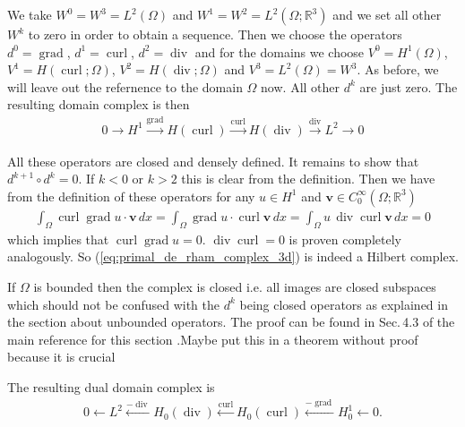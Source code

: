 \documentclass[12pt,a4paper]{article}
\numberwithin{equation}{subsection}
\numberwithin{lemma}{subsection}
\theoremstyle{definition}
\DeclareMathOperator{\curl}{curl}
\DeclareMathOperator{\diver}{div}
\DeclareMathOperator{\grad}{grad}
\newcommand{\real}{\mathbb{R}}
\begin{document}
We take $W^0 = W^3 = L^2(\Omega)$ and $W^1 = W^2 = L^2(\Omega;\real^3)$ 
and we set all other $W^k$ to zero in order to obtain a sequence.
Then we choose the operators $d^0 = \grad$, $d^1 = \curl$, $d^2 = \diver$ and
for the domains we choose $V^0 = H^1(\Omega)$, $V^1 = H(\curl;\Omega)$, 
$V^2 = H(\diver;\Omega)$ and $V^3 = L^2(\Omega) = W^3$. 
As before, we will leave out the refernence to the domain $\Omega$ now.
All other 
$d^k$ are just zero. The resulting domain complex is then
\begin{align}
    0 \rightarrow H^1 \xrightarrow{\grad} H(\curl)
        \xrightarrow{\curl} H(\diver) \xrightarrow{\diver} L^2 \rightarrow 0
    \label{eq:primal_de_rham_complex_3d}
\end{align}

All these operators are closed and densely defined. It remains to show that 
$d^{k+1} \circ d^k = 0$. If $k < 0$ or $k>2$ this is clear from the definition. 
Then we have from the definition of these operators 
for any $u \in H^1$ and $\mathbf{v} \in C^\infty_0(\Omega;\real^3)$  
\begin{align*}
    \int_\Omega \curl \grad u \cdot \mathbf{v} \, dx 
    = \int_\Omega \grad u \cdot \curl \mathbf{v} \, dx 
    = \int_\Omega u \, \diver \curl \mathbf{v} \, dx
    = 0
\end{align*}
which implies that $\curl \grad u = 0$. $\diver \curl = 0$ is proven 
completely analogously. So (\ref{eq:primal_de_rham_complex_3d}) is indeed a 
Hilbert complex. 

If $\Omega$ is bounded then the complex is closed i.e. all images 
are closed subspaces which should not be confused with the $d^k$ being closed operators
as explained in the section about unbounded operators. The proof can be found 
in Sec.\,4.3 of the main reference for this section \cite{arnold}.{\color{red}Maybe put 
this in a theorem without proof because it is crucial}

The resulting dual domain complex is 
\begin{align*}
    0 \leftarrow L^2 \xleftarrow{-\diver} H_0(\diver)
        \xleftarrow{\curl} H_0(\curl) 
        \xleftarrow{-\grad} H^1_0 \leftarrow 0.
\end{align*}
\end{document}
